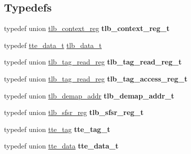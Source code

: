 \subsection*{Typedefs}
\begin{DoxyCompactItemize}
\item 
\mbox{\label{group__RTEMSBSPsSPARC64mm_ga20a1f85e1f0916a754c0a4f9bec7e35d}} 
typedef union \mbox{\hyperlink{uniontlb__context__reg}{tlb\+\_\+context\+\_\+reg}} {\bfseries tlb\+\_\+context\+\_\+reg\+\_\+t}
\item 
typedef \mbox{\hyperlink{uniontte__data}{tte\+\_\+data\+\_\+t}} \mbox{\hyperlink{group__RTEMSBSPsSPARC64mm_ga9c71ce7b9e5efa24b9e891795f8a59e1}{tlb\+\_\+data\+\_\+t}}
\item 
\mbox{\label{group__RTEMSBSPsSPARC64mm_ga20e7333495430df4556a0b686d66c621}} 
typedef union \mbox{\hyperlink{uniontlb__tag__read__reg}{tlb\+\_\+tag\+\_\+read\+\_\+reg}} {\bfseries tlb\+\_\+tag\+\_\+read\+\_\+reg\+\_\+t}
\item 
\mbox{\label{group__RTEMSBSPsSPARC64mm_gabf281b3ecca258f3a06ba9116ffa6a3c}} 
typedef union \mbox{\hyperlink{uniontlb__tag__read__reg}{tlb\+\_\+tag\+\_\+read\+\_\+reg}} {\bfseries tlb\+\_\+tag\+\_\+access\+\_\+reg\+\_\+t}
\item 
\mbox{\label{group__RTEMSBSPsSPARC64mm_ga33d178a07efad5575f78b2609d7ad9ec}} 
typedef union \mbox{\hyperlink{uniontlb__demap__addr}{tlb\+\_\+demap\+\_\+addr}} {\bfseries tlb\+\_\+demap\+\_\+addr\+\_\+t}
\item 
\mbox{\label{group__RTEMSBSPsSPARC64mm_ga045b521c1e2e59635bf38fca8a3f9749}} 
typedef union \mbox{\hyperlink{uniontlb__sfsr__reg}{tlb\+\_\+sfsr\+\_\+reg}} {\bfseries tlb\+\_\+sfsr\+\_\+reg\+\_\+t}
\item 
\mbox{\label{group__RTEMSBSPsSPARC64mm_gaa320bca31ee0bb05479e945a897b0f98}} 
typedef union \mbox{\hyperlink{uniontte__tag}{tte\+\_\+tag}} {\bfseries tte\+\_\+tag\+\_\+t}
\item 
\mbox{\label{group__RTEMSBSPsSPARC64mm_ga6a38bacf4cb76dabc8569ff7ef27fbb3}} 
typedef union \mbox{\hyperlink{uniontte__data}{tte\+\_\+data}} {\bfseries tte\+\_\+data\+\_\+t}
\end{DoxyCompactItemize}
